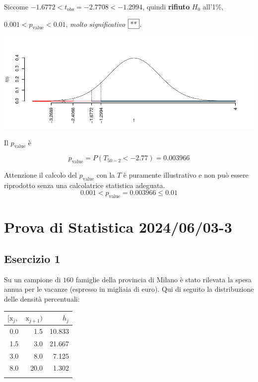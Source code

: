 \documentclass[
  11pt,
]{book}
\theoremstyle{mytheoremstyle}
\theoremstyle{mydefstyle}
\newenvironment{sol}
  {
  \begin{tcolorbox}[enhanced,breakable,arc=0.1mm,boxrule=1pt,colback=white,colframe=iblue,
  title=\bf \fontfamily{lmss}\selectfont \hspace{.5 cm} Soluzione,drop fuzzy shadow]

}{
\end{tcolorbox}
  }
\begin{document}
\begin{sol}
Siccome \(-1.6772<t_\text{obs}=-2.7708<-1.2994\), quindi \textbf{rifiuto} \(H_0\) all'1\%,

\(0.001<p_\text{value}<0.01\), \emph{molto significativo} \(\fbox{**}\).

\begin{center}\includegraphics{Esami_passati_con_soluzioni_files/figure-latex/2024-59-1} \end{center}

Il \(p_{\text{value}}\) è

\[ p_{\text{value}} = P(T_{50-2}<-2.77)=0.003966 \]

Attenzione il calcolo del \(p_\text{value}\) con la \(T\) è puramente illustrativo e non può essere riprodotto senza una calcolatrice statistica adeguata.\[
 0.001 < p_\text{value}= 0.003966 \leq 0.01 
\]

\end{sol}

\section{Prova di Statistica 2024/06/03-3}\label{prova-di-statistica-20240603-3}

\subsection{Esercizio 1}\label{esercizio-1-37}

Su un campione di \(160\) famiglie della provincia di Milano è stato rilevata la spesa annua per le vacanze (espresso in migliaia di euro). Qui di seguito la distribuzione delle densità percentuali:

\begin{table}[H]
\centering
\begin{tabular}{rrr}
\toprule
$[\text{x}_j,$ & $\text{x}_{j+1})$ & $h_j$\\
\midrule
0.0 & 1.5 & 10.833\\
1.5 & 3.0 & 21.667\\
3.0 & 8.0 & 7.125\\
8.0 & 20.0 & 1.302\\
 &  & \\
\bottomrule
\end{tabular}
\end{table}
\end{document}
